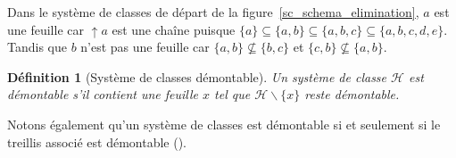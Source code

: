 \documentclass[a4paper]{report}
\newtheorem{definition}{Définition}[chapter]
\begin{document}
Dans le système de classes de départ de la figure~\ref{sc_schema_elimination}, $a$ est une feuille car $\uparrow a$ est une chaîne
 puisque $\{a\} \subseteq \{a, b\} \subseteq \{a, b, c\} \subseteq \{a, b, c, d, e\}$.
Tandis que $b$ n'est pas une feuille car $\{a, b\}  \not\subseteq \{b, c\}$ et $\{c, b\}  \not\subseteq \{a, b\}$.


\begin{definition}[Système de classes démontable]

\label{sysclassdemontable}
Un système de classe $\mathcal{H}$ est démontable s'il contient une feuille $x$ tel que $\mathcal{H} \backslash \{x\}$ 
reste démontable.
\end{definition}

Notons également qu'un système de classes est démontable si et seulement si le treillis associé est démontable (\cite{par_clu}).
\end{document}
